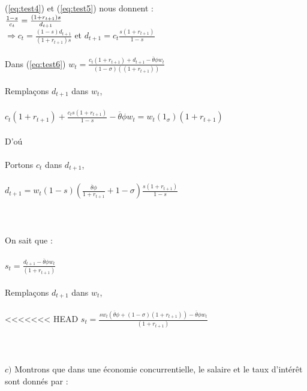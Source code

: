 \documentclass[11pt,twoside,a4paper]{article}
\begin{document}
(\ref{eq:test4}) et (\ref{eq:test5}) nous donnent : \\

$\\
\frac{1-s}{c_t} = \frac{(1+r_{t+1})s}{ d_{t+1}}\\
$\\
$ \Rightarrow c_t= \frac{(1-s)d_{t+1}}{(1+r_{t+1})s}$  \: et \: $ d_{t+1}=c_t \frac{ s{(1+r_{t+1})}}{1-s}$\\ \\
Dans (\ref{eq:test6})\: $ w_t = \frac{c_t(1+r_{t+1}) + d_{t+1}-\overline{\theta}\phi w_t}{(1-\sigma)((1+r_{t+1}))}$\\ \\
Rempla\c{c}ons $d_{t+1}$ dans $w_t$, \\ \\
$c_t(1+r_{t+1})+\frac{c_t s{(1+r_{t+1})}}{1-s}-\overline{\theta}\phi w_t= w_t(1_\sigma)(1+r_{t+1})$ \\ \\
D'o\'{u} \:
  \\ \\ 
 Portons $c_t$ dans $d_{t+1}$, \\ \\
 $ d_{t+1}= w_t(1-s)(\frac{\overline{\theta}\phi}{1+r_{t+1}} +1- \sigma )\frac{ s{(1+r_{t+1})}}{1-s}$ \\ \\
\\ \\
 On sait que :  \\ \\
 $s_t=\frac{d_{t+1}-\overline{\theta}\phi w_t}{(1+r_{t+1})}$\\ \\ 
 Rempla\c{c}ons $d_{t+1}$ dans $w_t$, \\ \\
<<<<<<< HEAD
  $s_t=\frac{s w_t\left(\overline{\theta}\phi +(1- \sigma)(1+r_{t+1}) \right)-\overline{\theta}\phi w_t}{(1+r_{t+1})}$\\ \\
\\ \\
$c)$ Montrons que dans une économie concurrentielle, le salaire et le taux d'intér\^{e}t sont donnés par :\\ \\
\end{document}
